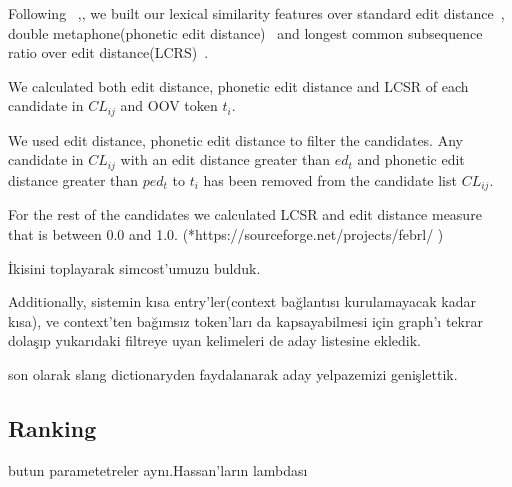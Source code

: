 Following ~\cite{Han:2011:LNS:2002472.2002520},\cite{DBLP:conf/acl/HassanM13}, we built our lexical similarity features over standard edit distance~\cite{levenshtein1966bcc}, double metaphone(phonetic edit distance)~\cite{Philips:2000:DMS:349124.349132} and longest common subsequence ratio over edit distance(LCRS)~\cite{Contractor:2010:UCN:1944566.1944588}.

We calculated both edit distance, phonetic edit distance and LCSR of each candidate in $CL_{ij}$ and OOV token $t_i$.

We used edit distance, phonetic edit distance to filter the candidates. Any candidate in $CL_{ij}$ with an edit distance greater than $ed_t$ and phonetic edit distance greater than $ped_t$ to $t_i$ has been removed from the candidate list $CL_{ij}$.

For the rest of the candidates we calculated LCSR and edit distance measure that is between 0.0 and 1.0. (*https://sourceforge.net/projects/febrl/ )

İkisini toplayarak simcost'umuzu bulduk.

Additionally, sistemin kısa entry'ler(context bağlantısı kurulamayacak kadar kısa), ve context'ten bağımsız token'ları da kapsayabilmesi için graph'ı tekrar dolaşıp yukarıdaki filtreye uyan kelimeleri de aday listesine ekledik.

son olarak slang dictionaryden faydalanarak aday yelpazemizi genişlettik.

\subsection{Ranking}

butun parametetreler aynı.Hassan'ların lambdası
